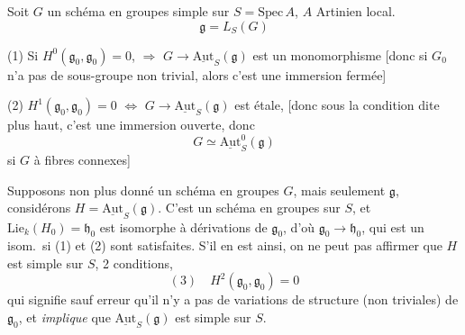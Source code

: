 \documentclass[11pt,a4paper]{article}
\begin{document}


Soit $G$ un schéma en groupes simple sur
$S = \mathrm{Spec}\, A$, $A$ Artinien local.
\[
\mathfrak{g} = L_S(G)
\]

(1) Si $H^0(\mathfrak{g}_0, \mathfrak{g}_0) = 0$, $\Longrightarrow$
$G \to \underline{\mathrm{Aut}}_S(\mathfrak{g})$ est un
monomorphisme [donc si $G_0$ n'a pas de sous-groupe
 \struck{\ill{}} non trivial,
alors c'est une immersion fermée]

(2)  \struck{\ill{}} $H^1(\mathfrak{g}_0, \mathfrak{g}_0) = 0$
$\Longleftrightarrow$ \struck{\ill{}} $G \to
\underline{\mathrm{Aut}}_S(\mathfrak{g})$ est étale, [donc sous la
condition dite plus haut, c'est une immersion ouverte, donc
\[
G \simeq \underline{\mathrm{Aut}}^0_S(\mathfrak{g})
\]
si $G$ à fibres connexes]


Supposons non plus donné un schéma en groupes $G$, mais seulement
 $\mathfrak{g}$, considérons
$H = \underline{\mathrm{Aut}}_S(\mathfrak{g})$.  C'est un
schéma en groupes sur $S$, et
$\mathrm{Lie}_k(H_0) = \mathfrak{h}_0$ est isomorphe à  
 dérivations de $\mathfrak{g}_0$, d'où
$\mathfrak{g}_0 \to \mathfrak{h}_0$, qui est un isom.\ si (1) et (2) sont
satisfaites. S'il en est ainsi, on ne peut pas affirmer
 que $H$ est simple sur $S$, \ill{} \ill{} \ill{}
 2 conditions,  \ill{} \ill{}
 \ill{} 
\[
(3) \quad H^2(\mathfrak{g}_0, \mathfrak{g}_0) = 0
\]
qui signifie sauf erreur qu'il n'y a pas de variations de structure
 (non triviales) de $\mathfrak{g}_0$, et
\emph{implique} que \struck{\ill{} \ill{}}
$\underline{\mathrm{Aut}}_S(\mathfrak{g})$ est simple sur $S$.
\end{document}
